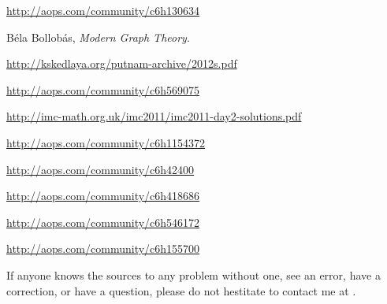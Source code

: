 \documentclass[11pt,paper=letter]{scrartcl}
\begin{document}
\begin{thebibliography}{99}

 \url{http://aops.com/community/c6h130634}

 B\'ela Bollob\'as, \emph{Modern Graph Theory}.

 \url{http://kskedlaya.org/putnam-archive/2012s.pdf}

 \url{http://aops.com/community/c6h569075}

 \url{http://imc-math.org.uk/imc2011/imc2011-day2-solutions.pdf}

 \url{http://aops.com/community/c6h1154372}

 \url{http://aops.com/community/c6h42400}

 \url{http://aops.com/community/c6h418686}

 \url{http://aops.com/community/c6h546172}

 \url{http://aops.com/community/c6h155700}

\end{thebibliography}

If anyone knows the sources to any problem without one, see an error, have a correction, or have a question, please do not hestitate to contact me at .
\end{document}
